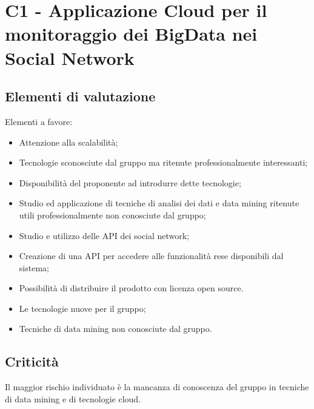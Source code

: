 \section{C1 - Applicazione Cloud per il monitoraggio dei BigData nei Social Network}{
	\subsection{Elementi di valutazione}{
		Elementi a favore:
		\begin{itemize}
			\item Attenzione alla scalabilità;
			\item Tecnologie sconosciute dal gruppo ma ritenute professionalmente interessanti;
			\item Disponibilità del proponente ad introdurre dette tecnologie;
			\item Studio ed applicazione di tecniche di analisi dei dati e data mining ritenute utili professionalmente non conosciute dal gruppo;
			\item Studio e utilizzo delle API dei social network;
			\item Creazione di una API per accedere alle funzionalità rese disponibili dal sistema;
			\item Possibilità di distribuire il prodotto con licenza open source.
		\end{itemize}
		
		\begin{itemize}
			\item Le tecnologie nuove per il gruppo;
			\item Tecniche di data mining non conosciute dal gruppo.
		\end{itemize}
	}
	\subsection{Criticità}{
		Il maggior rischio individuato è la mancanza di conoscenza del gruppo in tecniche di data mining e di tecnologie cloud.
	}
}
